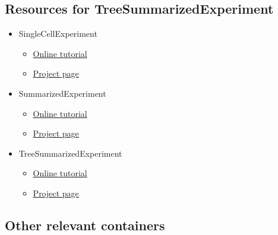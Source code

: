 \documentclass[
]{book}
\providecommand{\tightlist}{%
  \setlength{\itemsep}{0pt}\setlength{\parskip}{0pt}}
\begin{document}
\hypertarget{resources-for-treesummarizedexperiment}{%
\subsection{Resources for TreeSummarizedExperiment}\label{resources-for-treesummarizedexperiment}}

\begin{itemize}
\tightlist
\item
  SingleCellExperiment \citep{R-SingleCellExperiment}

  \begin{itemize}
  \tightlist
  \item
    \href{https://bioconductor.org/packages/release/bioc/vignettes/SingleCellExperiment/inst/doc/intro.html}{Online tutorial}
  \item
    \href{https://bioconductor.org/packages/release/bioc/html/SingleCellExperiment.html}{Project page}
  \end{itemize}
\item
  SummarizedExperiment \citep{R-SummarizedExperiment}

  \begin{itemize}
  \tightlist
  \item
    \href{https://bioconductor.org/packages/release/bioc/vignettes/SummarizedExperiment/inst/doc/SummarizedExperiment.html}{Online tutorial}
  \item
    \href{https://bioconductor.org/packages/release/bioc/html/SummarizedExperiment.html}{Project page}
  \end{itemize}
\item
  TreeSummarizedExperiment \citep{R-TreeSummarizedExperiment}

  \begin{itemize}
  \tightlist
  \item
    \href{https://bioconductor.org/packages/release/bioc/vignettes/TreeSummarizedExperiment/inst/doc/Introduction_to_treeSummarizedExperiment.html}{Online tutorial}
  \item
    \href{https://www.bioconductor.org/packages/release/bioc/html/TreeSummarizedExperiment.html}{Project page}
  \end{itemize}
\end{itemize}

\hypertarget{other-relevant-containers}{%
\subsection{Other relevant containers}\label{other-relevant-containers}}
\end{document}
